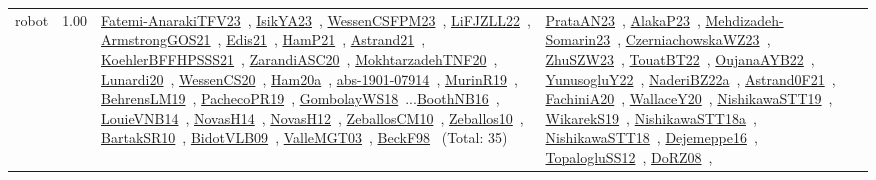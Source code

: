 {\begin{longtable}{p{3cm}r>{\raggedright\arraybackslash}p{6cm}>{\raggedright\arraybackslash}p{6cm}>{\raggedright\arraybackslash}p{8cm}}
\index{robot}\index{ApplicationAreas!robot}robot &  1.00 & \href{../works/Fatemi-AnarakiTFV23.pdf}{Fatemi-AnarakiTFV23}~\cite{Fatemi-AnarakiTFV23}, \href{../works/IsikYA23.pdf}{IsikYA23}~\cite{IsikYA23}, \href{../works/WessenCSFPM23.pdf}{WessenCSFPM23}~\cite{WessenCSFPM23}, \href{../works/LiFJZLL22.pdf}{LiFJZLL22}~\cite{LiFJZLL22}, \href{../works/ArmstrongGOS21.pdf}{ArmstrongGOS21}~\cite{ArmstrongGOS21}, \href{../works/Edis21.pdf}{Edis21}~\cite{Edis21}, \href{../works/HamP21.pdf}{HamP21}~\cite{HamP21}, \href{../works/Astrand21.pdf}{Astrand21}~\cite{Astrand21}, \href{../works/KoehlerBFFHPSSS21.pdf}{KoehlerBFFHPSSS21}~\cite{KoehlerBFFHPSSS21}, \href{../works/ZarandiASC20.pdf}{ZarandiASC20}~\cite{ZarandiASC20}, \href{../works/MokhtarzadehTNF20.pdf}{MokhtarzadehTNF20}~\cite{MokhtarzadehTNF20}, \href{../works/Lunardi20.pdf}{Lunardi20}~\cite{Lunardi20}, \href{../works/WessenCS20.pdf}{WessenCS20}~\cite{WessenCS20}, \href{../works/Ham20a.pdf}{Ham20a}~\cite{Ham20a}, \href{../works/abs-1901-07914.pdf}{abs-1901-07914}~\cite{abs-1901-07914}, \href{../works/MurinR19.pdf}{MurinR19}~\cite{MurinR19}, \href{../works/BehrensLM19.pdf}{BehrensLM19}~\cite{BehrensLM19}, \href{../works/PachecoPR19.pdf}{PachecoPR19}~\cite{PachecoPR19}, \href{../works/GombolayWS18.pdf}{GombolayWS18}~\cite{GombolayWS18}...\href{../works/BoothNB16.pdf}{BoothNB16}~\cite{BoothNB16}, \href{../works/LouieVNB14.pdf}{LouieVNB14}~\cite{LouieVNB14}, \href{../works/NovasH14.pdf}{NovasH14}~\cite{NovasH14}, \href{../works/NovasH12.pdf}{NovasH12}~\cite{NovasH12}, \href{../works/ZeballosCM10.pdf}{ZeballosCM10}~\cite{ZeballosCM10}, \href{../works/Zeballos10.pdf}{Zeballos10}~\cite{Zeballos10}, \href{../works/BartakSR10.pdf}{BartakSR10}~\cite{BartakSR10}, \href{../works/BidotVLB09.pdf}{BidotVLB09}~\cite{BidotVLB09}, \href{../works/ValleMGT03.pdf}{ValleMGT03}~\cite{ValleMGT03}, \href{../works/BeckF98.pdf}{BeckF98}~\cite{BeckF98} (Total: 35) & \href{../works/PrataAN23.pdf}{PrataAN23}~\cite{PrataAN23}, \href{../works/AlakaP23.pdf}{AlakaP23}~\cite{AlakaP23}, \href{../works/Mehdizadeh-Somarin23.pdf}{Mehdizadeh-Somarin23}~\cite{Mehdizadeh-Somarin23}, \href{../works/CzerniachowskaWZ23.pdf}{CzerniachowskaWZ23}~\cite{CzerniachowskaWZ23}, \href{../works/ZhuSZW23.pdf}{ZhuSZW23}~\cite{ZhuSZW23}, \href{../works/TouatBT22.pdf}{TouatBT22}~\cite{TouatBT22}, \href{../works/OujanaAYB22.pdf}{OujanaAYB22}~\cite{OujanaAYB22}, \href{../works/YunusogluY22.pdf}{YunusogluY22}~\cite{YunusogluY22}, \href{../works/NaderiBZ22a.pdf}{NaderiBZ22a}~\cite{NaderiBZ22a}, \href{../works/Astrand0F21.pdf}{Astrand0F21}~\cite{Astrand0F21}, \href{../works/FachiniA20.pdf}{FachiniA20}~\cite{FachiniA20}, \href{../works/WallaceY20.pdf}{WallaceY20}~\cite{WallaceY20}, \href{../works/NishikawaSTT19.pdf}{NishikawaSTT19}~\cite{NishikawaSTT19}, \href{../works/WikarekS19.pdf}{WikarekS19}~\cite{WikarekS19}, \href{../works/NishikawaSTT18a.pdf}{NishikawaSTT18a}~\cite{NishikawaSTT18a}, \href{../works/NishikawaSTT18.pdf}{NishikawaSTT18}~\cite{NishikawaSTT18}, \href{../works/Dejemeppe16.pdf}{Dejemeppe16}~\cite{Dejemeppe16}, \href{../works/TopalogluSS12.pdf}{TopalogluSS12}~\cite{TopalogluSS12}, \href{../works/DoRZ08.pdf}{DoRZ08}~\cite{DoRZ08}, 
\end{longtable}}

